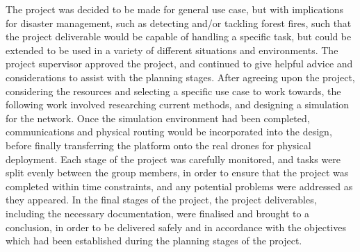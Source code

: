 The project was decided to be made for general use case, but with implications for disaster management, such as detecting and/or tackling forest fires, such that the project deliverable would be capable of handling a specific task, but could be extended to be used in a variety of different situations and environments. The project supervisor approved the project, and continued to give helpful advice and considerations to assist with the planning stages. After agreeing upon the project, considering the resources and selecting a specific use case to work towards, the following work involved researching current methods, and designing a simulation for the network. Once the simulation environment had been completed, communications and physical routing would be incorporated into the design, before finally transferring the platform onto the real drones for physical deployment. Each stage of the project was carefully monitored, and tasks were split evenly between the group members, in order to ensure that the project was completed within time constraints, and any potential problems were addressed as they appeared. In the final stages of the project, the project deliverables, including the necessary documentation, were finalised and brought to a conclusion, in order to be delivered safely and in accordance with the objectives which had been established during the planning stages of the project.
